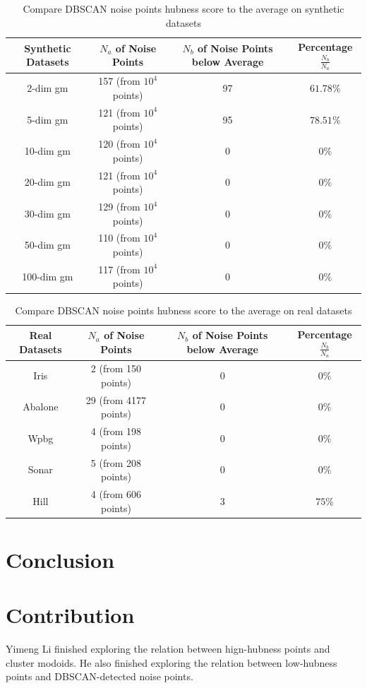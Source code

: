 \documentclass[11pt]{article}
\begin{document}
\begin{table}
\begin{center}
	\begin{tabular}{||c c c c||}
	\hline
	Synthetic Datasets & $N_{a}$ of Noise Points& $N_{b}$ of Noise Points below Average & Percentage $\frac{N_{b}}{N_{a}}$\\[0.5ex]
	\hline
	\hline
	2-dim gm & 157 (from $10^4$ points) & 97 & $61.78\%$\\
	\hline
	5-dim gm & 121 (from $10^4$ points) & 95 & $78.51\%$\\
	\hline
	10-dim gm & 120 (from $10^4$ points) & 0 & $0\%$\\
	\hline
	20-dim gm & 121 (from $10^4$ points) & 0 & $0\%$\\
	\hline
	30-dim gm & 129 (from $10^4$ points) & 0 & $0\%$\\
	\hline
	50-dim gm & 110 (from $10^4$ points) & 0 & $0\%$\\
	\hline
	100-dim gm & 117 (from $10^4$ points) & 0 & $0\%$\\
	\hline
\end{tabular}
\caption{Compare DBSCAN noise points hubness score to the average on synthetic datasets}
\end{center}
\label{tab:noise1}
\end{table} 

\begin{table}
\begin{center}
	\begin{tabular}{||c c c c||}
	\hline
	Real Datasets & $N_{a}$ of Noise Points & $N_{b}$ of Noise Points below Average & Percentage $\frac{N_{b}}{N_{a}}$\\[0.5ex]
	\hline
	\hline
	Iris & 2 (from 150 points) & 0 & $0\%$\\
	\hline
	Abalone & 29 (from 4177 points) & 0 & $0\%$\\
	\hline
	Wpbg & 4 (from 198 points) & 0 & $0\%$\\
	\hline
	Sonar & 5 (from 208 points) & 0 & $0\%$\\
	\hline
	Hill & 4 (from 606 points) & 3 & $75\%$\\
	\hline
\end{tabular}
\caption{Compare DBSCAN noise points hubness score to the average on real datasets}
\end{center}
\label{tab:noise2}
\end{table} 


\section{Conclusion}

\section{Contribution}
Yimeng Li finished exploring the relation between hign-hubness points and cluster modoids. He also finished exploring the relation between low-hubness points and DBSCAN-detected noise points.


\end{document}
